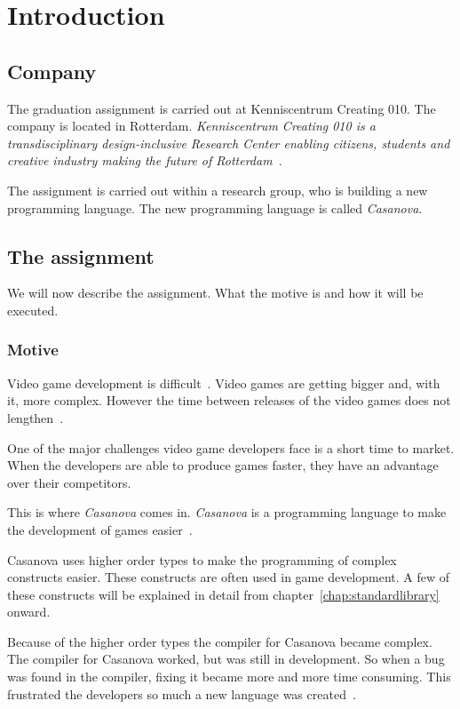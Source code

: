 \chapter{Introduction}
\section{Company}
The graduation assignment is carried out at Kenniscentrum Creating 010.
The company is located in Rotterdam.
\textit{Kenniscentrum Creating 010 is a transdisciplinary design-inclusive Research Center enabling citizens, students and creative industry making the future of Rotterdam}~\cite{creating2016home}.

The assignment is carried out within a research group, who is building a new programming language.
The new programming language is called \emph{Casanova}.


\section{The assignment}
We will now describe the assignment.
What the motive is and how it will be executed.

\subsection{Motive}
Video game development is difficult~\cite{blow2004game}.
Video games are getting bigger and, with it, more complex.
However the time between releases of the video games does not lengthen~\cite{blow2004game}.

One of the major challenges video game developers face is a short time to market.
When the developers are able to produce games faster, they have an advantage over their competitors.

This is where \emph{Casanova} comes in.
\emph{Casanova} is a programming language to make the development of games easier~\cite{maggiore2011designing}.

Casanova uses higher order types to make the programming of complex constructs easier.
These constructs are often used in game development.
A few of these constructs will be explained in detail from chapter~\ref{chap:standardlibrary} onward.

Because of the higher order types the compiler for Casanova became complex.
The compiler for Casanova worked, but was still in development.
So when a bug was found in the compiler, fixing it became more and more time consuming.
This frustrated the developers so much a new language was created~\cite{giuseppe2015mc}.

